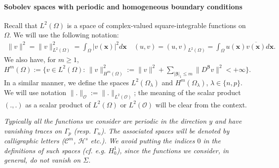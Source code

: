 \documentclass[report]{elsarticle}
\numberwithin{theorem}{section}
\renewcommand{\vec}[1]{\mathbf{#1}}
\begin{document}
\paragraph{\textbf{Sobolev spaces with periodic and homogeneous boundary conditions}} Recall that $L^2(\Omega)$ is a space of complex-valued square-integrable functions on $\Omega$. We will use the following notation:
\begin{align*}
	\|v\|^2=\|v\|^2_{L^2(\Omega)}=\int_{\Omega}|v(\vec{x})|^2d\vec{x} \quad (u, v)=(u,v)_{L^2(\Omega)}=\int_{\Omega}u(\vec{x})\overline{v(\vec{x})}d\vec{x}.
\end{align*} 
We also have, for $m\geq 1$,  $H^m(\Omega):=\{v\in L^2(\Omega): \, \|v\|^2_{H^m(\Omega)}:=\|v\|^2+\sum\limits_{|\vec{\boldsymbol{\beta}}|_{1}\leq m}\|D^{\boldsymbol{\beta}} v\|^2<+\infty\}. $ In a similar manner, we define the spaces  $L^2(\Omega_{\lambda})$ and $H^m(\Omega_{\lambda})$, $\lambda\in \{n,p\}$. We will use notation $\|.\|_{\mathcal{O}}:=\|.\|_{L^2(\mathcal{O})}$; the meaning of the scalar product $(.,.)$ as a scalar product of $L^2(\Omega)$ or $L^2(\mathcal{O})$ will be clear from the context.  	

\textit{Typically all the functions we consider are periodic in the direction $y$ and have vanishing traces on $\Gamma_p$ (resp. $\Gamma_n$). 
	The associated spaces will be denoted by calligraphic letters ($\mathcal{C}^m$, $\mathcal{H}^s$ etc.). We avoid putting the indices $0$ in the definitions of such spaces (cf. e.g. $H^1_0$), since the functions we consider, in general, do not vanish on $\Sigma$.}
\end{document}
